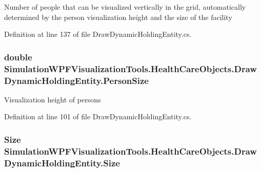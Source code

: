 Number of people that can be visualized vertically in the grid, automatically determined by the person visualization height and the size of the facility 



Definition at line 137 of file Draw\+Dynamic\+Holding\+Entity.\+cs.

\subsubsection[{\texorpdfstring{Person\+Size}{PersonSize}}]{\setlength{\rightskip}{0pt plus 5cm}double Simulation\+W\+P\+F\+Visualization\+Tools.\+Health\+Care\+Objects.\+Draw\+Dynamic\+Holding\+Entity.\+Person\+Size\hspace{0.3cm}{\ttfamily [get]}}\hypertarget{class_simulation_w_p_f_visualization_tools_1_1_health_care_objects_1_1_draw_dynamic_holding_entity_a398ebc529efea3f47c8a263c301d3836}{}\label{class_simulation_w_p_f_visualization_tools_1_1_health_care_objects_1_1_draw_dynamic_holding_entity_a398ebc529efea3f47c8a263c301d3836}


Visualization height of persons 



Definition at line 101 of file Draw\+Dynamic\+Holding\+Entity.\+cs.

\subsubsection[{\texorpdfstring{Size}{Size}}]{\setlength{\rightskip}{0pt plus 5cm}Size Simulation\+W\+P\+F\+Visualization\+Tools.\+Health\+Care\+Objects.\+Draw\+Dynamic\+Holding\+Entity.\+Size\hspace{0.3cm}{\ttfamily [get]}}\hypertarget{class_simulation_w_p_f_visualization_tools_1_1_health_care_objects_1_1_draw_dynamic_holding_entity_a0090bc66182a727ad5a89b2775e91cf5}{}\label{class_simulation_w_p_f_visualization_tools_1_1_health_care_objects_1_1_draw_dynamic_holding_entity_a0090bc66182a727ad5a89b2775e91cf5}


